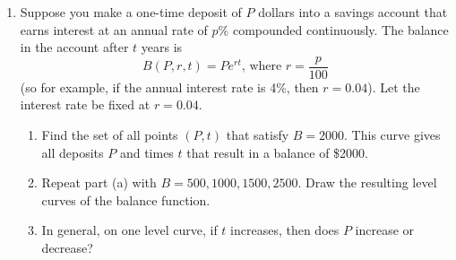 \documentclass[%
]{article}
\begin{document}
\begin{enumerate}

\item %
Suppose you make a one-time deposit of $P$ dollars into a savings account that earns interest at an annual rate of $p\%$ compounded continuously.  The balance in the account after $t$ years is 
\[
B(P,r,t)=Pe^{rt}\text{, where $r=\frac{p}{100}$}
\]
(so for example, if the annual interest rate is 4\%, then $r=0.04$).  Let the interest rate be fixed at $r=0.04$.
\begin{enumerate}
	\item Find the set of all points $(P,t)$ that satisfy $B=2000$.  This curve gives all deposits $P$ and times $t$ that result in a balance of \$2000. 
	\item Repeat part (a) with $B=500,1000,1500,2500$.  Draw the resulting level curves of the balance function.
	\item In general, on one level curve, if $t$ increases, then does $P$ increase or decrease?
\end{enumerate}

\end{enumerate}
\end{document}
